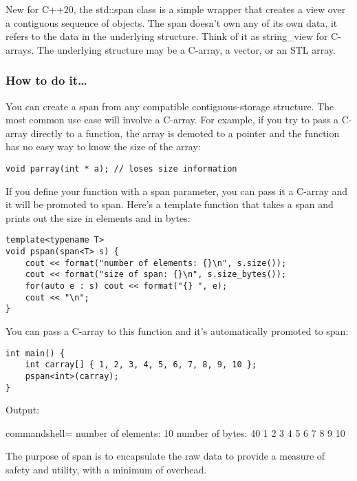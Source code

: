 
New for C++20, the std::span class is a simple wrapper that creates a view over a contiguous sequence of objects. The span doesn't own any of its own data, it refers to the data in the underlying structure. Think of it as string\_view for C-arrays. The underlying structure may be a C-array, a vector, or an STL array.

\subsubsection{How to do it…}

You can create a span from any compatible contiguous-storage structure. The most common use case will involve a C-array. For example, if you try to pass a C-array directly to a function, the array is demoted to a pointer and the function has no easy way to know the size of the array:

\begin{lstlisting}[style=styleCXX]
void parray(int * a); // loses size information
\end{lstlisting}

If you define your function with a span parameter, you can pass it a C-array and it will be promoted to span. Here's a template function that takes a span and prints out the size in elements and in bytes:

\begin{lstlisting}[style=styleCXX]
template<typename T>
void pspan(span<T> s) {
	cout << format("number of elements: {}\n", s.size());
	cout << format("size of span: {}\n", s.size_bytes());
	for(auto e : s) cout << format("{} ", e);
	cout << "\n";
}
\end{lstlisting}

You can pass a C-array to this function and it's automatically promoted to span:

\begin{lstlisting}[style=styleCXX]
int main() {
	int carray[] { 1, 2, 3, 4, 5, 6, 7, 8, 9, 10 };
	pspan<int>(carray);
}
\end{lstlisting}

Output:

\begin{tcblisting}{commandshell={}}
number of elements: 10
number of bytes: 40
1 2 3 4 5 6 7 8 9 10
\end{tcblisting}

The purpose of span is to encapsulate the raw data to provide a measure of safety and utility, with a minimum of overhead.

